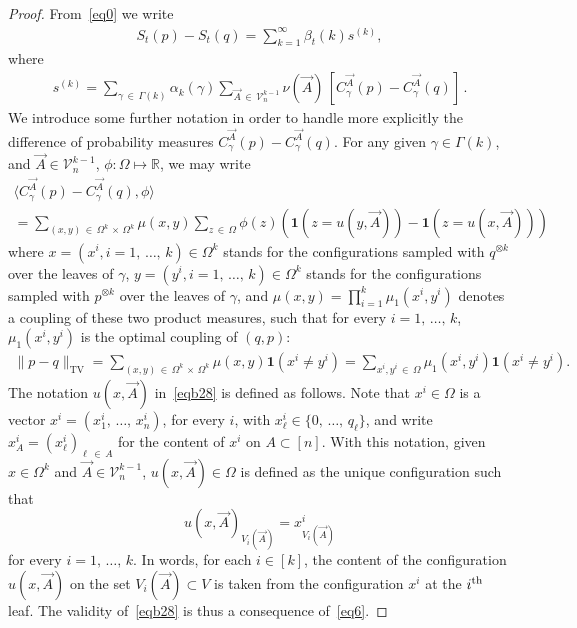 \documentclass[AHL,Unicode,longabstracts,published]{cedram}
\newcommand{\scalar}[2]{\langle #1, #2\rangle}
\newcommand{\tv}{\mathrm{TV}}
\newcommand{\ind}{\mathbf{1}}
\newcommand{\cV}{\mathcal{V}}
\newcommand{\bbR}{\mathbb{R}}
\let\b=\beta
\let\g=\gamma
\let\G=\Gamma
\let\O=\Omega
\begin{document}
\begin{proof}
From~\eqref{eq0} we write
\begin{align}\label{eqb17}
S_t(p) - S_t(q) =\sum_{k=1}^\infty \b_t(k) s^{(k)},
\end{align}
where
\begin{align}\label{eqba17}
s^{(k)}=\sum_{\gamma\,\in\,\Gamma(k)}\alpha_k(\gamma)
\sum_{\vec A\,\in\,\cV_n^{k-1}}\nu(\vec A) \,\left[C^{\vec A}_{\gamma}(p)-C^{\vec A}_{\gamma}(q)\right]\,.
\end{align}
We introduce some further notation in order to handle more explicitly the difference of probability measures $C^{\vec A}_{\gamma}(p)-C^{\vec A}_{\gamma}(q)$. For any given $\g\in\G(k)$, and $\vec A\in \cV_n^{k-1}$, $\phi:\O\mapsto\bbR$, we may write
\begin{multline}\label{eqb28}
\scalar{C^{\vec A}_{\gamma}(p)-C^{\vec A}_{\gamma}(q)}{\phi}\\
 =\sum_{(x,y)\,\in\,\Omega^k\,\times\, \Omega^k}\mu(x,y) \sum_{z\,\in\,\Omega} \phi(z)\left(\ind\left(z=u(y,\vec A)\right)-\ind\left(z=u(x,\vec A)\right)
\right)
\end{multline}
where $x=(x^i,i=1,\,\dots,\,k)\in\O^k$ stands for the configurations sampled with $q^{\otimes k}$ over the leaves of $\g$, $y=(y^i,i=1,\,\dots,\,k)\in\O^k$ stands for the configurations sampled with $p^{\otimes k}$ over the leaves of $\g$, and $\mu(x,y)=\prod_{i=1}^k\mu_1(x^i,y^i)$ denotes a coupling of these two product measures, such that for every $i=1,\,\dots,\,k$, $\mu_1(x^i,y^i)$ is the optimal coupling of $(q,p)$:
\begin{align}\label{eq29}
\|p-q\|_{\tv} = \sum_{(x,y)\,\in\,\Omega^k\,\times\,\Omega^k}\mu(x,y) \ind\left(x^i\neq y^i\right)=\sum_{x^i,y^i\,\in\,\Omega}\mu_1\left(x^i,y^i\right) \ind\left(x^i\neq y^i\right).
\end{align}
The notation $u(x,\vec A)$ in~\eqref{eqb28} is defined as follows. Note that $x^i\in\O$ is a vector $x^i=(x^i_1,\,\dots,\,x^i_n)$, for every $i$, with $x^i_\ell\in\{0,\,\dots,\,q_\ell\}$, and write $x^i_A=(x^i_\ell)_{\ell\,\in\,A}$ for the content of $x^i$ on $A\subset[n]$. With this notation, given $x\in\Omega^k$ and $\vec A\in\cV_n^{k-1}$, $u(x,\vec A)\in\O$ is defined as the unique configuration such that
\[
u(x,\vec A)_{V_i(\vec A)} = x^i_{V_i(\vec A)}
\]
for every $i=1,\,\dots,\,k$. In words, for each $i\in[k]$, the content of the configuration $u(x,\vec A)$ on the set $V_i(\vec A)\subset V$ is taken from the configuration $x^i$ at the $i^{\rm th}$ leaf. The validity of~\eqref{eqb28} is thus a consequence of~\eqref{eq6}.


\end{proof}
\end{document}
